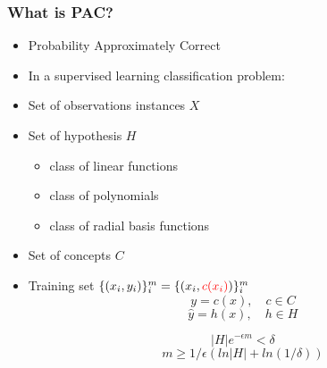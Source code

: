 \documentclass{beamer}
\newcommand{\tc}[2]{\textcolor{#1}{#2}}
\newcommand{\tcr}[1]{\tc{red}{#1}}
\begin{document}
\begin{frame}
	\frametitle{What is PAC?}
	\begin{itemize}
		\item Probability Approximately Correct
		\item In a supervised learning classification problem:
		\item Set of observations instances $X$
		\item Set of hypothesis $H$
		\begin{itemize}
			\item class of linear functions
			\item class of polynomials
			\item class of radial basis functions
		\end{itemize}
		\item Set of concepts $C$
		\item Training set $\{ (x_i, y_i) \}_i^m = \{ (x_i, \tcr{c(x_i)}) \}_i^m$
		$$y = c(x), \quad c \in C $$
		$$\hat{y} = h(x), \quad h \in H $$





		$$|H|e^{-\epsilon m} < \delta$$
		$$m \geq 1/\epsilon (ln|H| + ln(1/\delta))$$
	\end{itemize}
\end{frame}
\end{document}

